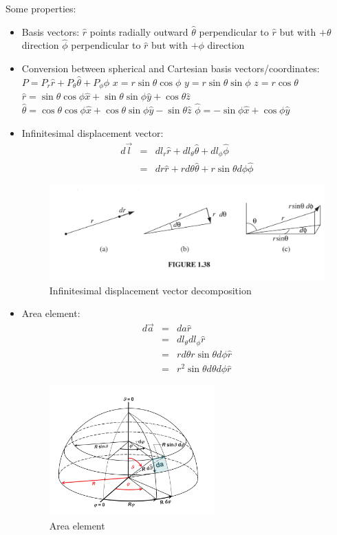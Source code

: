\documentclass[12pt,a4paper,twoside]{article}
\begin{document}
	Some properties:
	\begin{itemize}
		\item Basis vectors:
		\subitem $\hat{r}$ points radially outward
		\subitem $\hat{\theta}$ perpendicular to $\hat{r}$ but with $+\theta$ direction
		\subitem $\hat{\phi}$ perpendicular to $\hat{r}$ but with $+\phi$ direction
		
		\item Conversion between spherical and Cartesian basis vectors/coordinates:
		\subitem \(P=P_r\hat{r}+P_\theta\hat{\theta}+P_\phi\hat{\phi}\)
		\subitem \(x = r\sin\theta\cos\phi\)
		\subitem \(y=r\sin\theta\sin\phi\)
		\subitem \(z=r\cos\theta\)
		\subitem \(\hat{r}=\sin\theta\cos\phi\hat{x}+\sin\theta\sin\phi\hat{y}+\cos\theta\hat{z}\)
		\subitem \(\hat{\theta}=\cos\theta\cos\phi\hat{x}+\cos\theta\sin\phi\hat{y}-\sin\theta\hat{z}\)
		\subitem \(\hat{\phi}=-\sin\phi\hat{x}+\cos\phi\hat{y}\)
		
		\item Infinitesimal displacement vector:
		\begin{eqnarray*}
			d\overrightarrow{l} &=& dl_r\hat{r}+dl_\theta\hat{\theta}+dl_\phi\hat{\phi}\\
			&=& dr\hat{r}+rd\theta \hat{\theta} + r\sin\theta d\phi\hat{\phi}
		\end{eqnarray*}
		\begin{figure}[h]
			\centering
			\includegraphics[width=12cm]{250-Revision/spheric-dl.png}
			\caption{Infinitesimal displacement vector decomposition}
			\label{fig:spheric-dl}
		\end{figure}
		
		\item Area element:
		\begin{eqnarray*}
			d\overrightarrow{a} &=& da\hat{r}\\
			&=& dl_\theta dl_\phi \hat{r} \\
			&=& rd\theta r\sin\theta d\phi\hat{r}\\
			&=& r^2\sin\theta d\theta d\phi \hat{r}
		\end{eqnarray*}
		\begin{figure}[ht]
			\centering
			\includegraphics[height=5cm]{250-Revision/spherical-da.png}
			\caption{Area element}
			\label{fig:spherical-da}
		\end{figure}
		

\end{itemize}
\end{document}
